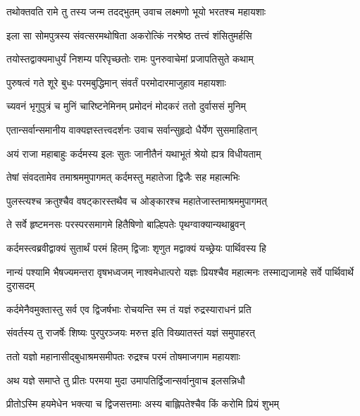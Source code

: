 
\twolineshloka
{तथोक्तवति रामे तु तस्य जन्म तदद्भुतम्}
{उवाच लक्ष्मणो भूयो भरतश्च महायशाः} %

\twolineshloka
{इला सा सोमपुत्रस्य संवत्सरमथोषिता}
{अकरोत्किं नरश्रेष्ठ तत्त्वं शंसितुमर्हसि} %

\twolineshloka
{तयोस्तद्वाक्यमाधुर्यं निशम्य परिपृच्छतोः}
{रामः पुनरुवाचेमां प्रजापतिसुते कथाम्} %

\twolineshloka
{पुरुषत्वं गते शूरे बुधः परमबुद्धिमान्}
{संवर्तं परमोदारमाजुहाव महायशाः} %

\twolineshloka
{च्यवनं भृगुपुत्रं च मुनिं चारिष्टनेमिनम्}
{प्रमोदनं मोदकरं ततो दुर्वाससं मुनिम्} %

\twolineshloka
{एतान्सर्वान्समानीय वाक्यज्ञस्तत्त्वदर्शनः}
{उवाच सर्वान्सुहृदो धैर्येण सुसमाहितान्} %

\twolineshloka
{अयं राजा महाबाहुः कर्दमस्य इलः सुतः}
{जानीतैनं यथाभूतं श्रेयो ह्यत्र विधीयताम्} %

\twolineshloka
{तेषां संवदतामेव तमाश्रममुपागमत्}
{कर्दमस्तु महातेजा द्विजैः सह महात्मभिः} %

\twolineshloka
{पुलस्त्यश्च क्रतुश्चैव वषट्कारस्तथैव च}
{ओङ्कारश्च महातेजास्तमाश्रममुपागमत्} %

\twolineshloka
{ते सर्वे हृष्टमनसः परस्परसमागमे}
{हितैषिणो बाल्हिपतेः पृथग्वाक्यान्यथाब्रुवन्} %

\twolineshloka
{कर्दमस्त्वब्रवीद्वाक्यं सुतार्थं परमं हितम्}
{द्विजाः शृणुत मद्वाक्यं यच्छ्रेयः पार्थिवस्य हि} %

\threelineshloka
{नान्यं पश्यामि भैषज्यमन्तरा वृषभध्वजम्}
{नाश्वमेधात्परो यज्ञः प्रियश्चैव महात्मनः}
{तस्माद्यजामहे सर्वे पार्थिवार्थे दुरासदम्} %

\twolineshloka
{कर्दमेनैवमुक्तास्तु सर्व एव द्विजर्षभाः}
{रोचयन्ति स्म तं यज्ञं रुद्रस्याराधनं प्रति} %

\twolineshloka
{संवर्तस्य तु राजर्षेः शिष्यः पुरपुरञ्जयः}
{मरुत्त इति विख्यातस्तं यज्ञं समुपाहरत्} %

\twolineshloka
{ततो यज्ञो महानासीद्बुधाश्रमसमीपतः}
{रुद्रश्च परमं तोषमाजगाम महायशाः} %

\twolineshloka
{अथ यज्ञे समाप्ते तु प्रीतः परमया मुदा}
{उमापतिर्द्विजान्सर्वानुवाच इलसन्निधौ} %

\twolineshloka
{प्रीतोऽस्मि हयमेधेन भक्त्या च द्विजसत्तमाः}
{अस्य बाह्लिपतेश्चैव किं करोमि प्रियं शुभम्} %

